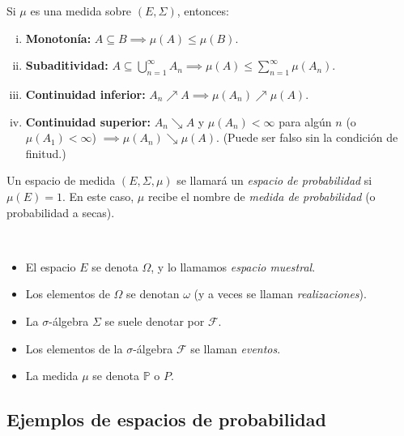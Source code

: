 \begin{property}
	Si \(\mu\) es una medida sobre \((E, \Sigma)\), entonces:
	\begin{enumerate}[i)]
		\item \textbf{Monotonía:} \(A \subseteq B \implies \mu(A) \leq \mu(B)\).

    	\item \textbf{Subaditividad:} \(A \subseteq \bigcup_{n=1}^{\infty} A_n \implies \mu(A) \leq \sum_{n=1}^{\infty} \mu(A_n)\).
		
		\item \textbf{Continuidad inferior:} \(A_n \nearrow A \implies \mu(A_n) \nearrow \mu(A)\).

		\item \textbf{Continuidad superior:} \(A_n \searrow A\) y \(\mu(A_n) < \infty\) para algún \(n\) (o \(\mu(A_1) < \infty\)) \(\implies \mu(A_n) \searrow \mu(A)\). (Puede ser falso sin la condición de finitud.)
	\end{enumerate}
\end{property}

\begin{definition}
    Un espacio de medida \((E, \Sigma, \mu)\) se llamará un \textit{espacio de probabilidad} si \(\mu(E) = 1\). En este caso, \(\mu\) recibe el nombre de \textit{medida de probabilidad} (o probabilidad a secas).
\end{definition}

\begin{notation}~
	\begin{itemize}
		\item El espacio \(E\) se denota \(\Omega\), y lo llamamos \textit{espacio muestral}.

		\item Los elementos de \(\Omega\) se denotan \(\omega\) (y a veces se llaman \textit{realizaciones}).

		\item La \(\sigma\)-álgebra \(\Sigma\) se suele denotar por \(\mathcal{F}\).

		\item Los elementos de la \(\sigma\)-álgebra \(\mathcal{F}\) se llaman \textit{eventos}.

		\item La medida \(\mu\) se denota \(\mathbb{P}\) o \(P\).
	\end{itemize}
\end{notation}

\subsection{Ejemplos de espacios de probabilidad}

